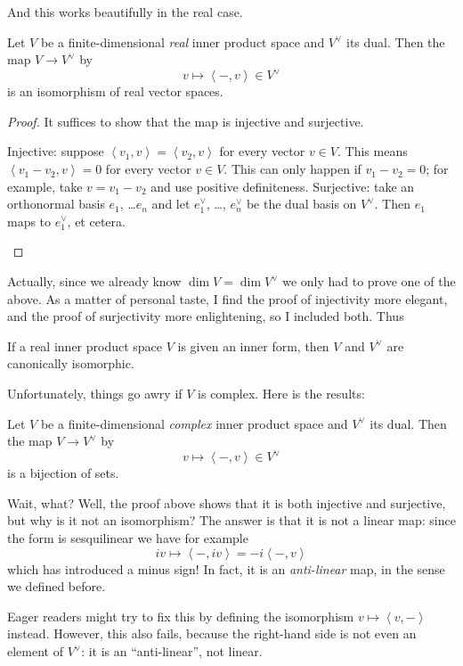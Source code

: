 And this works beautifully in the real case.
\begin{theorem}
	\label{thm:real_dual_isomorphic}
	Let $V$ be a finite-dimensional \emph{real}
	inner product space and $V^\vee$ its dual.
	Then the map $V \to V^\vee$ by
	\[ v \mapsto \left<  -, v \right> \in V^\vee \]
	is an isomorphism of real vector spaces.
\end{theorem}
\begin{proof}
	It suffices to show that the map is injective and surjective.
	\begin{itemize}
		\ii Injective: suppose $\left< v_1, v \right> = \left< v_2, v \right>$
		for every vector $v \in V$.
		This means $\left< v_1 - v_2, v \right> = 0$ for every vector $v \in V$.
		This can only happen if $v_1 - v_2 = 0$; for example, take $v = v_1 - v_2$
		and use positive definiteness.
		\ii Surjective: take an orthonormal basis $e_1$, \dots $e_n$
		and let $e_1^\vee$, \dots, $e_n^\vee$ be the dual basis on $V^\vee$.
		Then $e_1$ maps to $e_1^\vee$, et cetera.
		\qedhere
	\end{itemize}
\end{proof}
Actually, since we already know $\dim V = \dim V^\vee$
we only had to prove one of the above.
As a matter of personal taste, I find the proof of injectivity more elegant,
and the proof of surjectivity more enlightening,
so I included both.
Thus
\begin{moral}
	If a real inner product space $V$ is given an inner form,
	then $V$ and $V^\vee$ are canonically isomorphic.
\end{moral}

Unfortunately, things go awry if $V$ is complex.
Here is the results:
\begin{theorem}
	Let $V$ be a finite-dimensional \emph{complex}
	inner product space and $V^\vee$ its dual.
	Then the map $V \to V^\vee$ by
	\[ v \mapsto \left<  -, v \right> \in V^\vee \]
	is a bijection of sets.
\end{theorem}
Wait, what? Well, the proof above shows that it is both injective
and surjective, but why is it not an isomorphism?
The answer is that it is not a linear map:
since the form is sesquilinear we have for example
\[ iv \mapsto \left< -, iv\right> = -i \left< -, v\right> \]
which has introduced a minus sign!
In fact, it is an \emph{anti-linear} map, in the sense we defined before.

Eager readers might try to fix this by defining
the isomorphism $v \mapsto \left< v, - \right>$ instead.
However, this also fails, because the right-hand side
is not even an element of $V^\vee$:
it is an ``anti-linear'', not linear.

